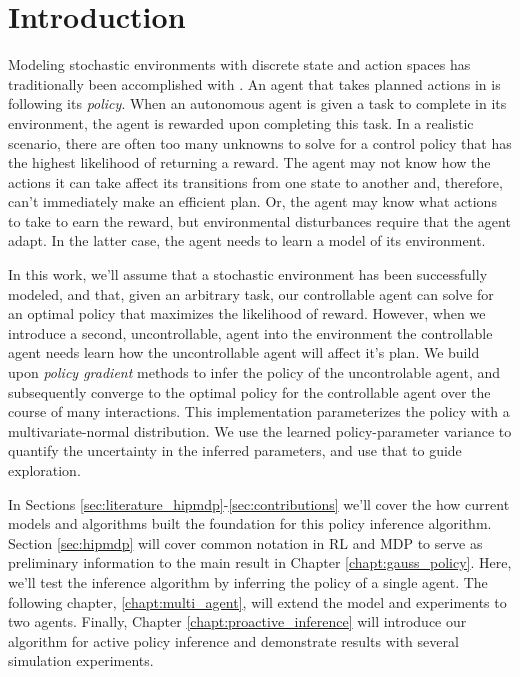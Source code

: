 \section{Introduction}\label{sec:introduction}

    Modeling stochastic environments with discrete state and action spaces has traditionally been accomplished with
    . An agent that takes planned actions in  is following its \textit{policy}. When an autonomous
    agent is given a task to complete in its environment, the agent is rewarded upon completing this task. In a
    realistic scenario, there are often too many unknowns to solve for a control policy that has the highest likelihood
    of returning a reward. The agent may not know how the actions it can take affect its transitions from one state to
    another and, therefore, can't immediately make an efficient plan. Or, the agent may know what actions to take to
    earn the reward, but environmental disturbances require that the agent adapt. In the latter case, the agent needs to
    learn a model of its environment.

    In this work, we'll assume that a stochastic environment has been successfully modeled, and that, given an arbitrary
    task, our controllable agent can solve for an optimal policy that maximizes the likelihood of reward. However, when
    we introduce a second, uncontrollable, agent into the environment the controllable agent needs learn how the
    uncontrollable agent will affect it's plan. We build upon \textit{policy gradient} methods to infer the policy of
    the uncontrolable agent, and subsequently converge to the optimal policy for the controllable agent over the course
    of many interactions. This implementation parameterizes the policy with a multivariate-normal distribution. We use
    the learned policy-parameter variance  to quantify the uncertainty in the inferred parameters, and use that to guide
    exploration.

    In Sections \ref{sec:literature_hipmdp}-\ref{sec:contributions} we'll cover the how current models and algorithms
    built the foundation for this policy inference algorithm. Section \ref{sec:hipmdp} will cover common notation in
    \ac{RL} and \ac{MDP} to serve as preliminary information to the main result in Chapter \ref{chapt:gauss_policy}.
    Here, we'll test the inference algorithm by inferring the policy of a single agent. The following chapter,
    \ref{chapt:multi_agent}, will extend the model and experiments to two agents. Finally, Chapter
    \ref{chapt:proactive_inference} will introduce our algorithm for active policy inference and demonstrate results
    with several simulation experiments.

